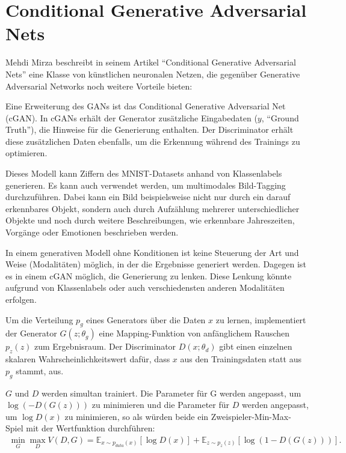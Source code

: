 \section{Conditional Generative Adversarial Nets}
\label{cgan}

Mehdi Mirza beschreibt in seinem Artikel ``Conditional Generative Adversarial Nets'' \cite{mirza2014conditional} eine Klasse von künstlichen neuronalen Netzen, die gegenüber Generative Adversarial Networks noch weitere Vorteile bieten:

Eine Erweiterung des GANs ist das Conditional Generative Adversarial Net (cGAN). In cGANs erhält der Generator zusätzliche Eingabedaten ($y$, ``Ground Truth''), die Hinweise für die Generierung enthalten. Der Discriminator erhält diese zusätzlichen Daten ebenfalls, um die Erkennung während des Trainings zu optimieren.

Dieses Modell kann Ziffern des MNIST-Datasets anhand von Klassenlabels generieren. Es kann auch verwendet werden, um multimodales Bild-Tagging durchzuführen. Dabei kann ein Bild beispielsweise nicht nur durch ein darauf erkennbares Objekt, sondern auch durch Aufzählung mehrerer unterschiedlicher Objekte und noch durch weitere Beschreibungen, wie erkennbare Jahreszeiten, Vorgänge oder Emotionen beschrieben werden.

In einem generativen Modell ohne Konditionen ist keine Steuerung der Art und Weise (Modalitäten) möglich, in der die Ergebnisse generiert werden. Dagegen ist es in einem cGAN möglich, die Generierung zu lenken. Diese Lenkung könnte aufgrund von Klassenlabels oder auch verschiedensten anderen Modalitäten erfolgen.

Um die Verteilung $p_g$ eines Generators über die Daten $x$ zu lernen, implementiert der Generator $G(z;\theta_g)$ eine Mapping-Funktion von anfänglichem Rauschen $p_z(z)$ zum Ergebnisraum. Der Discriminator $D(x;\theta_d)$ gibt einen einzelnen skalaren Wahrscheinlichkeitswert dafür, dass $x$ aus den Trainingsdaten statt aus $p_g$ stammt, aus.

$G$ und $D$ werden simultan trainiert. Die Parameter für G werden angepasst, um $\log(-D(G(z)))$ zu minimieren und die Parameter für $D$ werden angepasst, um $\log D(x)$ zu minimieren, so als würden beide ein Zweispieler-Min-Max-Spiel mit der Wertfunktion durchführen:
\begin{align}
\min_{G}\max_{D} V(D,G) = \mathbb{E}_{x\sim p_{data}(x)}[\log{D(x)}]+\mathbb{E}_{z\sim p_z(z)}[\log(1-D(G(z)))].
\end{align}

